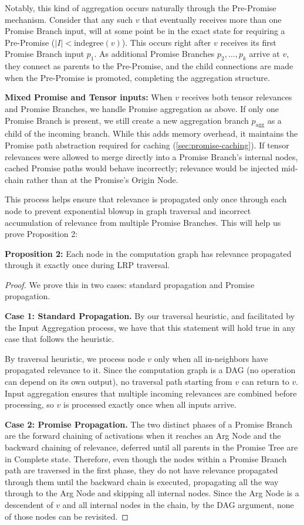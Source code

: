 \documentclass{article}
\begin{document}
Notably, this kind of aggregation occurs naturally through the Pre-Promise mechanism. Consider that any such $v$ that
eventually receives more than one Promise Branch input, will at some point be in the exact state for requiring a
Pre-Promise ($|I| < \text{indegree}(v)$). This occurs right after $v$ receives its first Promise Branch input $p_1$.
As additional Promise Branches $p_2, \ldots, p_k$ arrive at $v$, they connect as parents to the Pre-Promise, and the
child connections are made when the Pre-Promise is promoted, completing the aggregation structure.

\textbf{Mixed Promise and Tensor inputs:} When $v$ receives both tensor relevances and Promise Branches, we handle Promise
aggregation as above. If only one Promise Branch is present, we still create a new aggregation branch $p_{\text{agg}}$ as
a child of the incoming branch. While this adds memory overhead, it maintains the Promise path abstraction required for
caching (\ref{sec:promise-caching}). If tensor relevances were allowed to merge directly into a Promise Branch's
internal nodes, cached Promise paths would behave incorrectly; relevance would be injected mid-chain rather than at the
Promise's Origin Node.

This process helps ensure that relevance is propagated only once through each node to prevent exponential blowup in graph
traversal and incorrect accumulation of relevance from multiple Promise Branches. This will help us prove Proposition 2:

\textbf{Proposition 2:} Each node in the computation graph has relevance propagated through it exactly once during LRP traversal.
\begin{proof}
  We prove this in two cases: standard propagation and Promise propagation.

  \textbf{Case 1: Standard Propagation.}
  By our traversal heuristic, and facilitated by the Input Aggregation process, we have that this statement will hold true in any case that
  follows the heuristic.

  By traversal heuristic, we process node $v$ only when all in-neighbors have propagated relevance to it. Since the
  computation graph is a DAG (no operation can depend on its own output), no traversal path starting from $v$ can return
  to $v$. 
  Input aggregation ensures that multiple incoming relevances are combined before processing, so $v$ is processed exactly
  once when all inputs arrive.

  \textbf{Case 2: Promise Propagation.}
  The two distinct phases of a Promise Branch are the forward chaining of activations when it reaches an Arg Node and the
  backward chaining of relevance, deferred until all parents in the Promise Tree are in Complete state.
  Therefore, even though the nodes within a Promise Branch path are traversed in the first phase, they do not have
  relevance propagated through them until the backward chain is executed, propagating all the way through to the Arg Node
  and skipping all internal nodes. Since the Arg Node is a descendent of $v$ and all internal nodes in the chain, by the
  DAG argument, none of those nodes can be revisited.

\end{proof}
\end{document}
